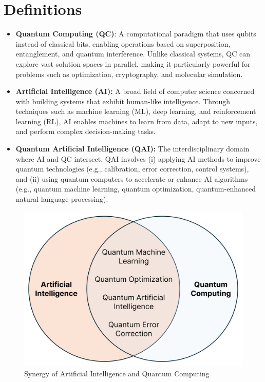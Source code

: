\section{Definitions}
\begin{itemize}
	\item \textbf{Quantum Computing (QC)}: A computational paradigm that uses qubits instead of classical bits, enabling operations based on superposition, entanglement, and quantum interference. Unlike classical systems, QC can explore vast solution spaces in parallel, making it particularly powerful for problems such as optimization, cryptography, and molecular simulation.
	\item \textbf{Artificial Intelligence (AI):} A broad field of computer science concerned with building systems that exhibit human-like intelligence. Through techniques such as machine learning (ML), deep learning, and reinforcement learning (RL), AI enables machines to learn from data, adapt to new inputs, and perform complex decision-making tasks.
	\item \textbf{Quantum Artificial Intelligence (QAI):} The interdisciplinary domain where AI and QC intersect. QAI involves (i) applying AI methods to improve quantum technologies (e.g., calibration, error correction, control systems), and (ii) using quantum computers to accelerate or enhance AI algorithms (e.g., quantum machine learning, quantum optimization, quantum-enhanced natural language processing).
\end{itemize}
\begin{figure}
	\centering
	\includegraphics[width=1\linewidth]{QAI.png}
	\caption{Synergy of Artificial Intelligence and Quantum Computing}
	\label{fig:enter-label}
\end{figure}
